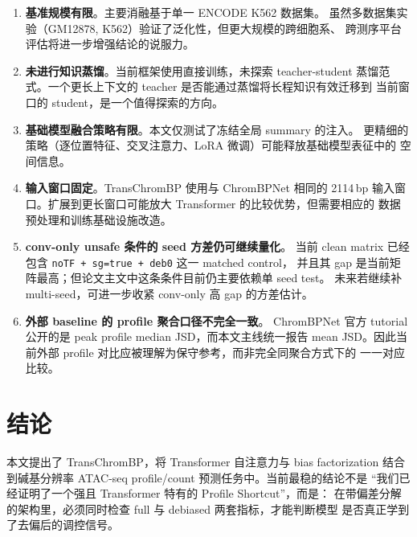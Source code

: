 \documentclass[11pt,a4paper]{ctexart}
\begin{document}
\begin{enumerate}[leftmargin=2em]
  \item \textbf{基准规模有限}。主要消融基于单一 ENCODE K562 数据集。
  虽然多数据集实验（GM12878, K562）验证了泛化性，但更大规模的跨细胞系、
  跨测序平台评估将进一步增强结论的说服力。

  \item \textbf{未进行知识蒸馏}。当前框架使用直接训练，未探索 teacher-student
  蒸馏范式。一个更长上下文的 teacher 是否能通过蒸馏将长程知识有效迁移到
  当前窗口的 student，是一个值得探索的方向。

  \item \textbf{基础模型融合策略有限}。本文仅测试了冻结全局 summary 的注入。
  更精细的策略（逐位置特征、交叉注意力、LoRA 微调）可能释放基础模型表征中的
  空间信息。

  \item \textbf{输入窗口固定}。TransChromBP 使用与 ChromBPNet 相同的 2114\,bp
  输入窗口。扩展到更长窗口可能放大 Transformer 的比较优势，但需要相应的
  数据预处理和训练基础设施改造。

  \item \textbf{conv-only unsafe 条件的 seed 方差仍可继续量化}。
  当前 clean matrix 已经包含 \texttt{noTF + sg=true + deb0} 这一 matched control，
  并且其 gap 是当前矩阵最高；但论文主文中这条条件目前仍主要依赖单 seed test。
  未来若继续补 multi-seed，可进一步收紧 conv-only 高 gap 的方差估计。

  \item \textbf{外部 baseline 的 profile 聚合口径不完全一致}。
  ChromBPNet 官方 tutorial 公开的是 peak profile median JSD，而本文主线统一报告
  mean JSD。因此当前外部 profile 对比应被理解为保守参考，而非完全同聚合方式下的
  一一对应比较。
\end{enumerate}

\section{结论}
\label{sec:conclusion}

本文提出了 TransChromBP，将 Transformer 自注意力与 bias factorization
结合到碱基分辨率 ATAC-seq profile/count 预测任务中。当前最稳的结论不是
“我们已经证明了一个强且 Transformer 特有的 Profile Shortcut”，而是：
在带偏差分解的架构里，必须同时检查 full 与 debiased 两套指标，才能判断模型
是否真正学到了去偏后的调控信号。
\end{document}
